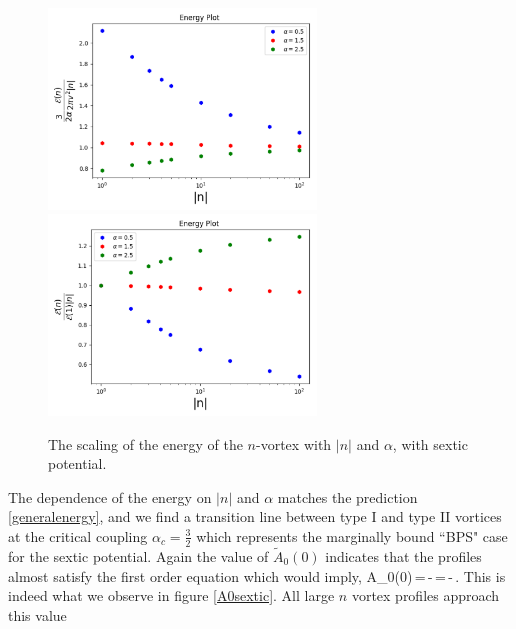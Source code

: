  \begin{figure}[H]
\begin{center}
 \includegraphics[width=2.8in]{Chapter_2_Folder_1912.11321/figures/sixth_order_alpha.pdf}\hspace{0.1in}\includegraphics[width=2.8in]{Chapter_2_Folder_1912.11321/figures/sixth_order_alpha_byE1.pdf}
     \caption[\textcolor{red}{This figure shows the scaling of the energy of the $n$-vortex with $|n|$ and $\alpha$, with sextic potential.}]{{ \small The scaling of the energy of the $n$-vortex with $|n|$ and $\alpha$, with sextic potential.}} \label{sexticenergy}
    \end{center}
\end{figure}
The dependence of the energy on $|n|$ and $\alpha$ matches the prediction \eqref{generalenergy}, and we find a transition line between type I and type II vortices at the critical coupling $\alpha_c = \tfrac32$ which represents the marginally bound ``BPS" case for the sextic potential.   Again the value of $\tilde A_0(0)$ indicates that the profiles almost satisfy the first order equation which would imply,
\be
\tilde A_0(0)\,=\,-\,=\,-\,.
\ee
This is indeed what we observe in figure \ref{A0sextic}. All large $n$ vortex profiles approach this value
